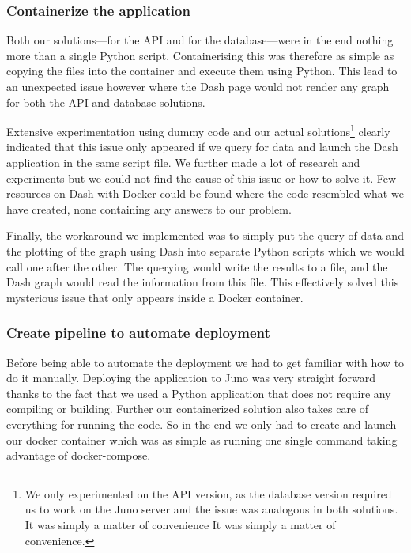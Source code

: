 \subsubsection{Containerize the application}

Both our solutions---for the API and for the database---were in the
end nothing more than a single Python script. Containerising this was
therefore as simple as copying the files into the container and
execute them using Python. This lead to an unexpected issue however
where the Dash page would not render any graph for both the API and
database solutions.

Extensive experimentation using dummy code and our actual
solutions\footnote{We only experimented on the API version, as the
	database version required us to work on the Juno server and the
	issue was analogous in both solutions. It was simply a matter of
convenience It was simply a matter of convenience.} clearly indicated
that this issue only appeared if we query for data and launch the Dash
application in the same script file. We further made a lot of research
and experiments but we could not find the cause of this issue or how
to solve it. Few resources on Dash with Docker could be found where
the code resembled what we have created, none containing any answers
to our problem.

Finally, the workaround we implemented was to simply put the query of
data and the plotting of the graph using Dash into separate Python
scripts which we would call one after the other. The querying would
write the results to a file, and the Dash graph would read the
information from this file. This effectively solved this mysterious
issue that only appears inside a Docker container.

\subsubsection{Create pipeline to automate deployment}

Before being able to automate the deployment we had to get familiar
with how to do it manually. Deploying the application to Juno was very
straight forward thanks to the fact that we used a Python application
that does not require any compiling or building. Further our
containerized solution also takes care of everything for running the
code. So in the end we only had to create and launch our docker
container which was as simple as running one single command taking
advantage of docker-compose.

